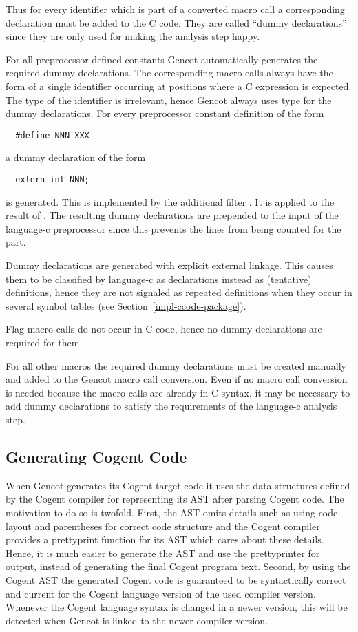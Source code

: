 Thus for every identifier which is part of a converted macro call a corresponding declaration must be added to the 
C code. They are called ``dummy declarations'' since they are only used for making the analysis step happy. 

For all preprocessor defined constants Gencot automatically generates the required dummy declarations. The corresponding
macro calls always have the form of a single identifier occurring at positions where a C expression is expected. The type
of the identifier is irrelevant, hence Gencot always uses type  for the dummy declarations. For every preprocessor
constant definition of the form 
\begin{verbatim}
  #define NNN XXX
\end{verbatim}
a dummy declaration of the form
\begin{verbatim}
  extern int NNN;
\end{verbatim}
is generated. This is implemented by the additional filter . It is applied to the result of 
. The resulting dummy declarations are prepended to the input of the language-c preprocessor
since this prevents the lines from being counted for the  part.

Dummy declarations are generated with explicit external linkage. This causes them to be classified by language-c as 
declarations instead as (tentative) definitions, hence they are not signaled as repeated definitions when they occur 
in several symbol tables (see Section~\ref{impl-ccode-package}).

Flag macro calls do not occur in C code, hence no dummy declarations are required for them.

For all other macros the required dummy declarations must be created manually and added to the Gencot macro call conversion.
Even if no macro call conversion is needed because the macro calls are already in C syntax, it may be necessary to
add dummy declarations to satisfy the requirements of the language-c analysis step.

\subsection{Generating Cogent Code}
\label{impl-ccode-gencog}

When Gencot generates its Cogent target code it uses the data structures defined by the Cogent compiler for representing
its AST after parsing Cogent code. The motivation to do so is twofold. First, the AST omits details such as using code layout
and parentheses for correct code structure and the Cogent compiler provides a prettyprint function for its AST which cares
about these details. Hence, it is much easier to generate the AST and use the prettyprinter for output, instead of generating
the final Cogent program text. Second, by using the Cogent AST the generated Cogent code is guaranteed to be syntactically correct and
current for the Cogent language version of the used compiler version. Whenever the Cogent language syntax is changed
in a newer version, this will be detected when Gencot is linked to the newer compiler version.

